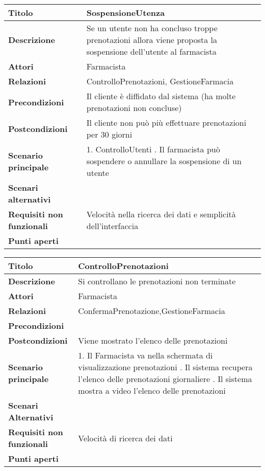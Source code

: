 \begin{tabular} {|P{4.5cm}|P{12.5cm}|}
  \hline
    \textbf{Titolo} & SospensioneUtenza\\
  \hline
    \textbf{Descrizione} & Se un utente non ha concluso troppe prenotazioni allora viene proposta la sospensione dell'utente al farmacista\\
  \hline
    \textbf{Attori} & Farmacista\\
  \hline
    \textbf{Relazioni} & ControlloPrenotazioni, GestioneFarmacia\\
  \hline
    \textbf{Precondizioni} & Il cliente è diffidato dal sistema (ha molte prenotazioni non concluse)\\
  \hline
    \textbf{Postcondizioni} & Il cliente non può più effettuare prenotazioni per 30 giorni\\
  \hline
    \textbf{Scenario principale} & 1. ControlloUtenti . Il
    farmacista può sospendere o annullare la sospensione di un utente \\
  \hline
    \textbf{Scenari alternativi} &\\
  \hline
    \textbf{Requisiti non funzionali} & Velocità nella ricerca dei dati e semplicità dell'interfaccia\\
  \hline
    \textbf{Punti aperti} &\\
  \hline
\end{tabular}
\hfill
\break

\begin{tabular} {|P{4.5cm}|P{12.5cm}|}
\hline
  \textbf{Titolo} & ControlloPrenotazioni\\
\hline
  \textbf{Descrizione} & Si controllano le prenotazioni non terminate\\
\hline
  \textbf{Attori} & Farmacista\\
\hline
  \textbf{Relazioni} & ConfermaPrenotazione,GestioneFarmacia\\
\hline
  \textbf{Precondizioni} &\\
\hline
  \textbf{Postcondizioni} & Viene mostrato l'elenco delle prenotazioni\\
\hline
  \textbf{Scenario principale} & 1. Il Farmacista va nella schermata di
  visualizzazione prenotazioni . Il sistema recupera l'elenco delle
  prenotazioni giornaliere . Il sistema mostra a video l'elenco delle
  prenotazioni\\
\hline
  \textbf{Scenari Alternativi} &\\
\hline
  \textbf{Requisiti non funzionali} & Velocità di ricerca dei dati\\
\hline
  \textbf{Punti aperti} &\\
\hline
\end{tabular}
\hfill
\break

